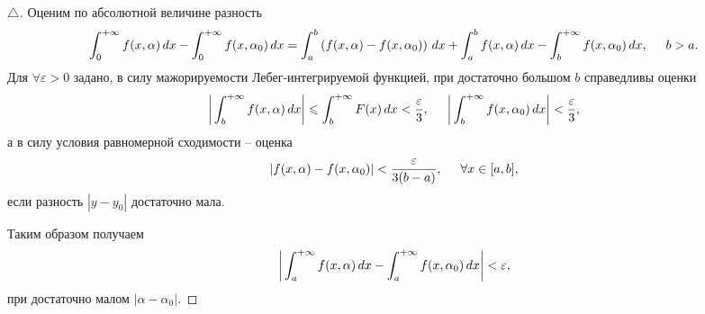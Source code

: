 \begin{proof}[$\triangle$]
Оценим по абсолютной величине разность
\begin{equation*}
    \int_{0}^{+\infty} f(x, \alpha) \, d x - \int_{0}^{+\infty} f(x, \alpha_0) \, d x = 
    \int_a^b \left(
        f(x, \alpha) - f(x, \alpha_0)
    \right) \, d x + \int_a^b f(x, \alpha) \, d x - \int_b^{+\infty} f(x, \alpha_0) \, d x,
    \hspace{5 mm}
    b > a.
\end{equation*}
Для $\forall \varepsilon > 0$ задано, в силу мажорируемости Лебег-интегрируемой функцией, при достаточно большом $b$ справедливы оценки
\begin{equation*}
    \bigg|
        \int_{b}^{+\infty} f(x, \alpha) \, d x
    \bigg| \leqslant \int_{b}^{+\infty} F(x) \, d x < \frac{\varepsilon}{3},
    \hspace{5 mm}
    \bigg|
        \int_{b}^{+\infty} f(x, \alpha_0) \, d x
    \bigg| < \frac{\varepsilon}{3},
\end{equation*}
а в силу условия равномерной сходимости -- оценка
\begin{equation*}
    |f(x, \alpha) - f(x, \alpha_0)| < \frac{\varepsilon}{3(b-a)}, \hspace{5 mm} \forall x \in [a, b],
\end{equation*}
если разность $|y-y_0|$ достаточно мала. 

Таким образом получаем
\begin{equation*}
    \bigg|
        \int_{a}^{+\infty} f(x, \alpha) \, d x - \int_{a}^{+\infty} f(x, \alpha_0) \, d x
    \bigg| < \varepsilon,
\end{equation*}
при достаточно малом $|\alpha-\alpha_0|$.
\end{proof}




